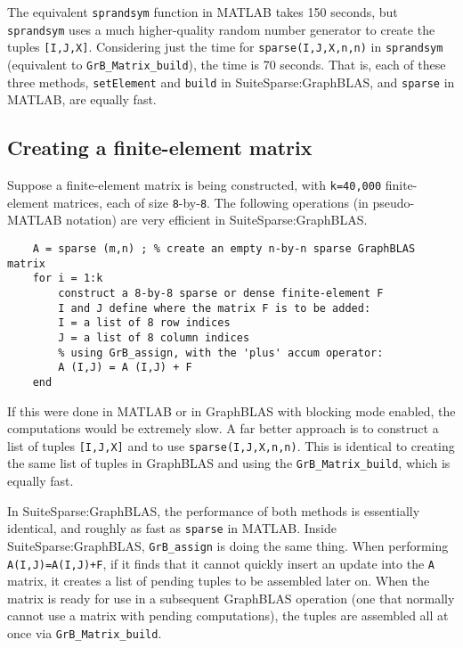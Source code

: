 \documentclass[12pt]{article}
\begin{document}
{The equivalent \verb'sprandsym' function in MATLAB takes 150 seconds, but
\verb'sprandsym' uses a much higher-quality random number generator to create
the tuples \verb'[I,J,X]'.  Considering just the time for
\verb'sparse(I,J,X,n,n)' in \verb'sprandsym' (equivalent to
\verb'GrB_Matrix_build'), the time is 70 seconds.  That is, each of these three
methods, \verb'setElement' and \verb'build' in SuiteSparse:GraphBLAS, and
\verb'sparse' in MATLAB, are equally fast.

\subsection{Creating a finite-element matrix}
\label{fem}

Suppose a finite-element matrix is being constructed, with \verb'k=40,000'
finite-element matrices, each of size \verb'8'-by-\verb'8'.  The following
operations (in pseudo-MATLAB notation) are very efficient in
SuiteSparse:GraphBLAS.

    {\footnotesize
    \begin{verbatim}
    A = sparse (m,n) ; % create an empty n-by-n sparse GraphBLAS matrix
    for i = 1:k
        construct a 8-by-8 sparse or dense finite-element F
        I and J define where the matrix F is to be added:
        I = a list of 8 row indices
        J = a list of 8 column indices
        % using GrB_assign, with the 'plus' accum operator:
        A (I,J) = A (I,J) + F
    end \end{verbatim}}

If this were done in MATLAB or in GraphBLAS with blocking mode enabled, the
computations would be extremely slow.  A far better approach is to construct a
list of tuples \verb'[I,J,X]' and to use \verb'sparse(I,J,X,n,n)'. This is
identical to creating the same list of tuples in GraphBLAS and using the
\verb'GrB_Matrix_build', which is equally fast.

In SuiteSparse:GraphBLAS, the performance of both methods is essentially
identical, and roughly as fast as \verb'sparse' in MATLAB.  Inside
SuiteSparse:GraphBLAS, \verb'GrB_assign' is doing the same thing. When
performing \verb'A(I,J)=A(I,J)+F', if it finds that it cannot quickly insert an
update into the \verb'A' matrix, it creates a list of pending tuples to be
assembled later on.   When the matrix is ready for use in a subsequent
GraphBLAS operation (one that normally cannot use a matrix with pending
computations), the tuples are assembled all at once via
\verb'GrB_Matrix_build'.

}
\end{document}
